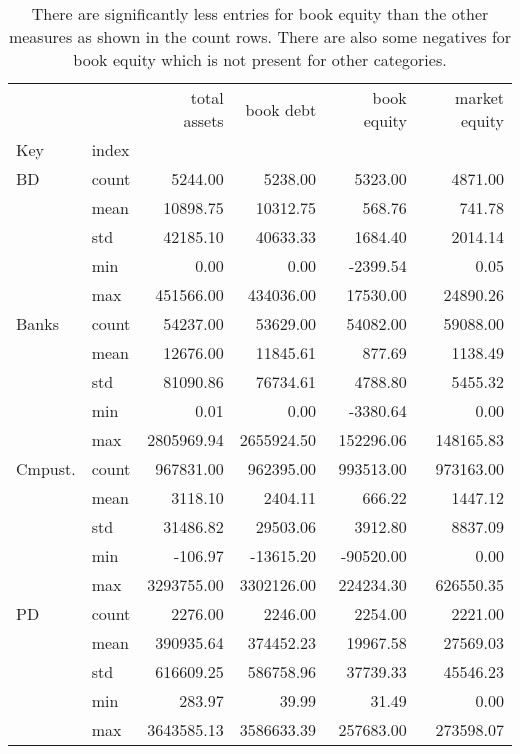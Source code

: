 \begin{table}
\caption{There are significantly less entries for book equity than the other measures as shown in the count rows. There are also some negatives for book equity which is not present for other categories. }
\label{tab:Table 2.1}
\begin{tabular}{llrrrr}
\toprule
 &  & total assets & book debt & book equity & market equity \\
Key & index &  &  &  &  \\
\midrule
{BD} & count & 5244.00 & 5238.00 & 5323.00 & 4871.00 \\
 & mean & 10898.75 & 10312.75 & 568.76 & 741.78 \\
 & std & 42185.10 & 40633.33 & 1684.40 & 2014.14 \\
 & min & 0.00 & 0.00 & -2399.54 & 0.05 \\
 & max & 451566.00 & 434036.00 & 17530.00 & 24890.26 \\
\cline{1-6}
{Banks} & count & 54237.00 & 53629.00 & 54082.00 & 59088.00 \\
 & mean & 12676.00 & 11845.61 & 877.69 & 1138.49 \\
 & std & 81090.86 & 76734.61 & 4788.80 & 5455.32 \\
 & min & 0.01 & 0.00 & -3380.64 & 0.00 \\
 & max & 2805969.94 & 2655924.50 & 152296.06 & 148165.83 \\
\cline{1-6}
{Cmpust.} & count & 967831.00 & 962395.00 & 993513.00 & 973163.00 \\
 & mean & 3118.10 & 2404.11 & 666.22 & 1447.12 \\
 & std & 31486.82 & 29503.06 & 3912.80 & 8837.09 \\
 & min & -106.97 & -13615.20 & -90520.00 & 0.00 \\
 & max & 3293755.00 & 3302126.00 & 224234.30 & 626550.35 \\
\cline{1-6}
{PD} & count & 2276.00 & 2246.00 & 2254.00 & 2221.00 \\
 & mean & 390935.64 & 374452.23 & 19967.58 & 27569.03 \\
 & std & 616609.25 & 586758.96 & 37739.33 & 45546.23 \\
 & min & 283.97 & 39.99 & 31.49 & 0.00 \\
 & max & 3643585.13 & 3586633.39 & 257683.00 & 273598.07 \\
\cline{1-6}
\bottomrule
\end{tabular}
\end{table}
